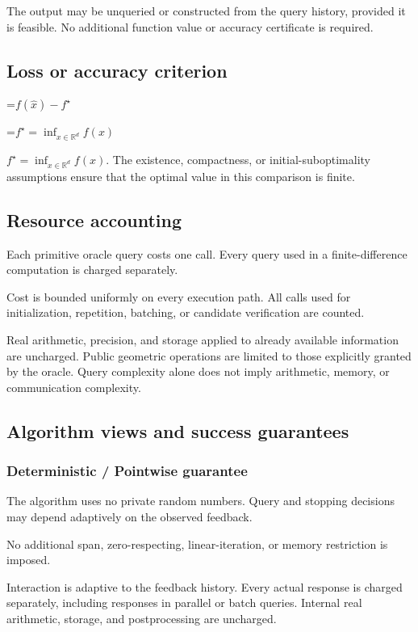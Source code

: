 \documentclass[10pt,a4paper]{article}
\newcommand{\AtlasMath}[1]{\par\begingroup\centering\setbox0=\hbox{$\displaystyle #1$}\ifdim\wd0>1.4\linewidth\typeout{ATLAS WIDE FORMULA: \the\wd0}\fi\ifdim\wd0>\linewidth\resizebox{\linewidth}{!}{\box0}\else\box0\fi\par\endgroup}
\newcommand{\AtlasInlineMath}[1]{\begingroup\setbox0=\hbox{$#1$}\ifdim\wd0>.4\linewidth\endgroup\AtlasMath{#1}\else\endgroup$#1$\fi}
\begin{document}
The output may be unqueried or constructed from the query history, provided it is feasible. No additional function value or accuracy certificate is required.

\subsection{Loss or accuracy criterion}

\AtlasMath{f(\widehat{x})-f^\star}


\AtlasInlineMath{f^\star=\inf_{x\in \mathbb{R}^d}f(x)}. The existence, compactness, or initial-suboptimality assumptions ensure that the optimal value in this comparison is finite.

\subsection{Resource accounting}
Each primitive oracle query costs one call. Every query used in a finite-difference computation is charged separately.

Cost is bounded uniformly on every execution path. All calls used for initialization, repetition, batching, or candidate verification are counted.

Real arithmetic, precision, and storage applied to already available information are uncharged. Public geometric operations are limited to those explicitly granted by the oracle. Query complexity alone does not imply arithmetic, memory, or communication complexity.

\subsection{Algorithm views and success guarantees}
\subsubsection{Deterministic / Pointwise guarantee}
The algorithm uses no private random numbers. Query and stopping decisions may depend adaptively on the observed feedback.

No additional span, zero-respecting, linear-iteration, or memory restriction is imposed.

Interaction is adaptive to the feedback history. Every actual response is charged separately, including responses in parallel or batch queries. Internal real arithmetic, storage, and postprocessing are uncharged.
\end{document}
